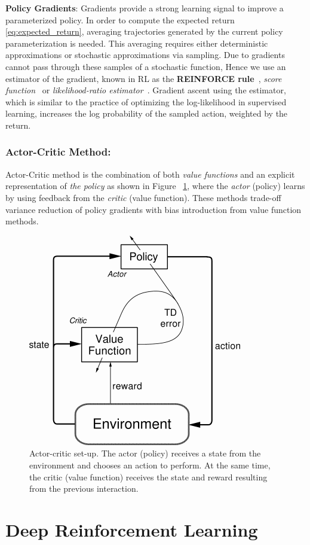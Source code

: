 \textbf{Policy Gradients}: Gradients provide a strong learning signal to improve a parameterized policy. In order to compute the expected return \eqref{eq:expected_return}, averaging trajectories generated by the current policy parameterization is needed. This averaging requires either deterministic approximations or stochastic approximations via sampling.
Due to gradients cannot pass through these samples of a stochastic function, 
Hence we use an estimator of the gradient, known in RL as the \textbf{REINFORCE rule}~\parencite{williams1992simple}, \textit{score function}~\parencite{fu2006gradient} or \textit{likelihood-ratio estimator}~\parencite{glynn1990likelihood}.
Gradient ascent using the estimator, which is similar to the practice of optimizing the log-likelihood in supervised learning, increases the log probability of the sampled action, weighted by the return.

\subsubsection{Actor-Critic Method:}
Actor-Critic method is the combination of both \textit{value functions} and an explicit representation of \textit{the policy} as shown in Figure ~\ref{fig:actor_critic}, where the \textit{actor} (policy) learns by using feedback from the \textit{critic} (value function). These methods trade-off variance reduction of policy gradients with bias introduction from value function methods.

\begin{figure}[!htb]
	        \centering
	        \includegraphics[width=.3\linewidth]{figures/actor_critic.png}
	        \caption{Actor-critic set-up. The actor (policy) receives a state from the environment and chooses an action to perform. At the same time, the critic (value function) receives the state and reward resulting from the previous interaction.~\parencite{arulkumaran2017brief}}
	        \label{fig:actor_critic}
\end{figure}



\section{Deep Reinforcement Learning}

